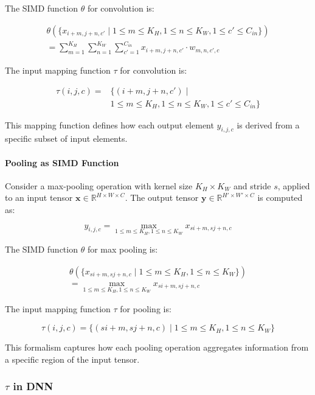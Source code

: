 The SIMD function $\theta$ for convolution is:

\[
\begin{split}
\theta(\{x_{i+m, j+n, c'} \mid 1 \leq m \leq K_H, 1 \leq n \leq K_W, 1 \leq c' \leq C_{in} \}) \\
= \sum_{m=1}^{K_H} \sum_{n=1}^{K_W} \sum_{c'=1}^{C_{in}} x_{i+m, j+n, c'} \cdot w_{m, n, c', c}
\end{split}
\]

The input mapping function $\tau$ for convolution is:

\begin{align*}
    \tau(i, j, c) = &\{(i+m, j+n, c') \mid \\
                    & 1 \leq m \leq K_H, 1 \leq n \leq K_W, 1 \leq c' \leq C_{in} \}
\end{align*}

This mapping function defines how each output element $y_{i,j,c}$ is derived from a specific subset of input elements.

\paragraph{Pooling as SIMD Function}

Consider a max-pooling operation with kernel size $K_H \times K_W$ and stride $s$, applied to an input tensor $\mathbf{x} \in \mathbb{R}^{H \times W \times C}$. The output tensor $\mathbf{y} \in \mathbb{R}^{H' \times W' \times C}$ is computed as:

\[
y_{i,j,c} = \max_{1 \leq m \leq K_H, 1 \leq n \leq K_W} x_{si+m, sj+n, c}
\]

The SIMD function $\theta$ for max pooling is:

\[
\begin{split}
\theta(\{x_{si+m, sj+n, c} \mid 1 \leq m \leq K_H, 1 \leq n \leq K_W \}) \\
= \max_{1 \leq m \leq K_H, 1 \leq n \leq K_W} x_{si+m, sj+n, c}
\end{split}
\]

The input mapping function $\tau$ for pooling is:

\[
\tau(i, j, c) = \{(si+m, sj+n, c) \mid 1 \leq m \leq K_H, 1 \leq n \leq K_W \}
\]

This formalism captures how each pooling operation aggregates information from a specific region of the input tensor.

\subsubsection{\Depmap $\tau$ in DNN}
\label{subsubsec:tau}

